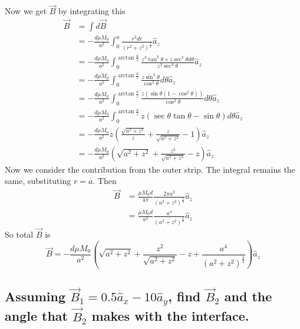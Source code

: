 \documentclass[answers]{exam}
\begin{document}
\begin{questions}
\begin{solution}
    Now we get $\vec B$ by integrating this
    \begin{align*}
        \vec B &= \int d\vec B \\
               &= -\frac{d\mu M_0}{a^2} \int_0^a \frac{r^3dr}{(r^2+z^2)^{\frac{3}{2}}} \hat a_z \\
               &= -\frac{d\mu M_0}{a^2} \int_0^{\arctan\frac{a}{z}} \frac{z^3\tan^3\theta\times z\sec^2\theta d\theta}{z^3\sec^3\theta} \hat a_z \\
               &= -\frac{d\mu M_0}{a^2} \int_0^{\arctan\frac{a}{z}} \frac{z\sin^3\theta}{\cos^2\theta}d\theta \hat a_z \\
               &= -\frac{d\mu M_0}{a^2} \int_0^{\arctan\frac{a}{z}} \frac{z(\sin\theta(1-\cos^2\theta))}{\cos^2\theta} d\theta \hat a_z \\
               &= -\frac{d\mu M_0}{a^2} \int_0^{\arctan\frac{a}{z}} z(\sec\theta\tan\theta - \sin\theta) d\theta \hat a_z \\
               &= -\frac{d\mu M_0}{a^2} z\left(\frac{\sqrt{a^2+z^2}}{z} + \frac{z}{\sqrt{a^2+z^2}} - 1\right) \hat a_z \\
               &= -\frac{d\mu M_0}{a^2} \left(\sqrt{a^2+z^2} + \frac{z^2}{\sqrt{a^2+z^2}} - z\right) \hat a_z
    \end{align*}
    Now we consider the contribution from the outer strip. The integral remains the same, substituting $r=a$. Then
    \begin{align*}
        \vec B &= \frac{\mu M_0d}{4\pi} \frac{2\pi a^2}{(a^2+z^2)^{\frac{3}{2}}} \hat a_z \\
               &= \frac{\mu M_0d}{a^2} \frac{a^4}{(a^2+z^2)^{\frac{3}{2}}} \hat a_z
    \end{align*}
    So total $\vec B$ is
    $$\vec B = -\frac{d\mu M_0}{a^2} \left(\sqrt{a^2+z^2} + \frac{z^2}{\sqrt{a^2+z^2}} - z + \frac{a^4}{(a^2+z^2)^{\frac{3}{2}}}\right) \hat a_z$$
\end{solution}


\begin{parts}
    \part{Assuming $\vec B_1 = 0.5\hat a_x - 10\hat a_y$, find $\vec B_2$ and the angle that $\vec B_2$ makes with the interface.}


\end{parts}
\end{questions}
\end{document}
